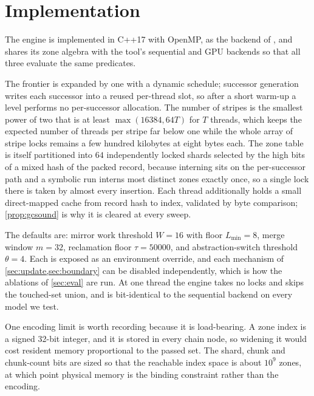 \section{Implementation}\label{sec:impl}

The engine is implemented in C++17 with OpenMP, as the  backend of
\tool{}, and shares its zone algebra with the tool's sequential and GPU backends
so that all three evaluate the same predicates.

The frontier is expanded by one  with a dynamic schedule;
successor generation writes each successor into a reused per-thread slot, so
after a short warm-up a level performs no per-successor allocation.  The number
of stripes is the smallest power of two that is at least $\max(16384, 64T)$ for
$T$ threads, which keeps the expected number of threads per stripe far below one
while the whole array of stripe locks remains a few hundred kilobytes at eight
bytes each.  The zone table is itself partitioned into $64$ independently locked
shards selected by the high bits of a mixed hash of the packed record, because
interning sits on the per-successor path and a symbolic run interns most distinct
zones exactly once, so a single lock there is taken by almost every insertion.
Each thread additionally holds a small direct-mapped cache from record hash to
index, validated by byte comparison; \cref{prop:gcsound} is why it is cleared at
every sweep.

The defaults are: mirror work threshold $W = 16$ with floor $L_{\min} = 8$, merge
window $m = 32$, reclamation floor $\tau = \num{50000}$, and abstraction-switch
threshold $\theta = 4$.  Each is exposed as an environment override, and each
mechanism of \cref{sec:update,sec:boundary} can be disabled independently, which
is how the ablations of \cref{sec:eval} are run.  At one thread the engine takes
no locks and skips the touched-set union, and is bit-identical to the sequential
backend on every model we test.

One encoding limit is worth recording because it is load-bearing.  A zone index
is a signed 32-bit integer, and it is stored in every chain node, so widening it
would cost resident memory proportional to the passed set.  The shard, chunk and
chunk-count bits are sized so that the reachable index space is about $10^9$
zones, at which point physical memory is the binding constraint rather than the
encoding.
